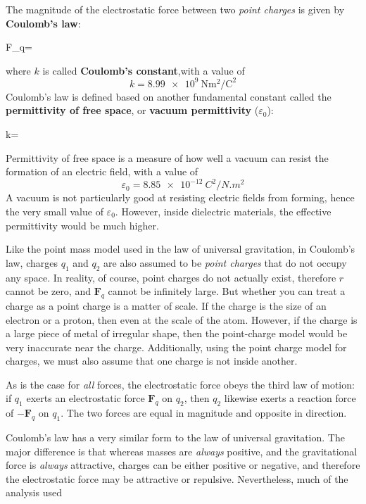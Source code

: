 The magnitude of the electrostatic force between two \emph{point charges} is
given by \textbf{Coulomb's law}:
\begin{important-equation}
  F_q=
  \label{eq:coulombs-law}
\end{important-equation}

where $k$ is called \textbf{Coulomb's constant},with a value of
\begin{equation*}
  k=\SI{8.99e9}{\newton\metre\squared\per\coulomb\squared}
\end{equation*}
Coulomb's law is defined based on another fundamental constant called the
\textbf{permittivity of free space}, or \textbf{vacuum permittivity}
($\varepsilon_0$):
\begin{important-equation}
  k=
\end{important-equation}
Permittivity of free space is a measure of how well a vacuum can resist the
formation of an electric field, with a value of
\begin{equation*}
  \varepsilon_0=\SI{8.85e-12}{C^2/N.m^2}
\end{equation*}
A vacuum is not particularly good at resisting electric fields from forming,
hence the very small value of $\varepsilon_0$. However, inside dielectric
materials, the effective permittivity would be much higher.

Like the point mass model used in the law of universal gravitation, in
Coulomb's law, charges $q_1$ and $q_2$ are also assumed to be
\emph{point charges} that do not occupy any space. In reality, of course, point
charges do not actually exist, therefore $r$ cannot be zero, and $\bm F_q$
cannot be infinitely large. But whether you can treat a charge as a point
charge is a matter of scale. If the charge is the size of an electron or a
proton, then even at the scale of the atom. However, if the charge is a large
piece of metal of irregular shape, then the point-charge model would be very
inaccurate near the charge. Additionally, using the point charge model for
charges, we must also assume that one charge is not inside another.

As is the case for \emph{all} forces, the electrostatic force obeys the third law
of motion: if $q_1$ exerts an electrostatic force $\bm F_q$ on $q_2$, then
$q_2$ likewise exerts a reaction force of $-\bm F_q$ on $q_1$. The two
forces are equal in magnitude and opposite in direction.

Coulomb's law has a very similar form to the law of universal
gravitation.
The major difference is that whereas masses are \emph{always} positive, and the
gravitational force is \emph{always} attractive, charges can be either positive
or negative, and therefore the electrostatic force may be attractive or
repulsive. Nevertheless, much of the analysis used


